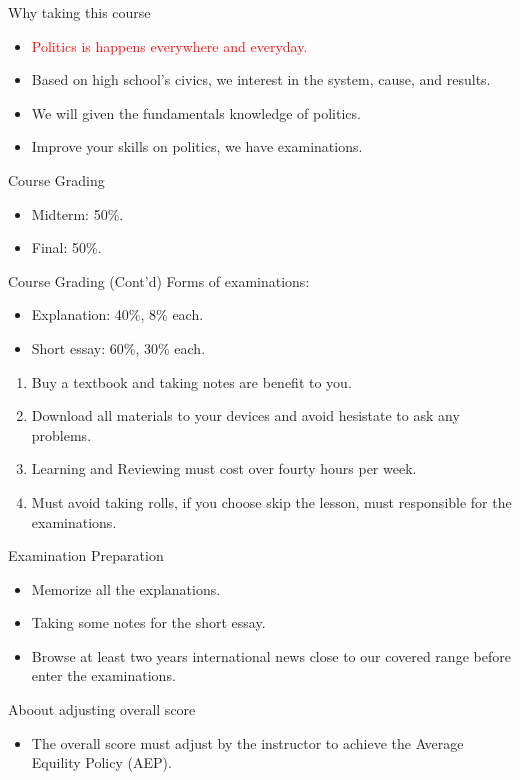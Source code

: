 \documentclass{beamer}
\begin{document}
\begin{frame}{Why taking this course}
\begin{itemize}
\pause
\item \textcolor{red}{Politics is happens everywhere and everyday.}
\pause
\item Based on high school's civics, we interest in the system, cause, and results.
\pause
\item We will given the fundamentals knowledge of politics.
\pause
\item Improve your skills on politics, we have examinations.
\end{itemize}
\end{frame}
\begin{frame}{Course Grading}
\begin{itemize}
\pause
\item Midterm: 50\%.
\pause
\item Final: 50\%.
\end{itemize}
\end{frame}
\begin{frame}{Course Grading (Cont'd)}
\pause
Forms of examinations:
\pause
\begin{itemize}
    \item Explanation: 40\%, 8\% each.
    \pause
    \item Short essay: 60\%, 30\% each.
\end{itemize}
\pause
\begin{enumerate}
\item Buy a textbook and taking notes are benefit to you.
\pause
\item Download all materials to your devices and avoid hesistate to ask any problems.
\pause
\item Learning and Reviewing must cost over fourty hours per week.
\pause
\item Must avoid taking rolls, if you choose skip the lesson, must responsible for the examinations.
\end{enumerate}
\end{frame}
\begin{frame}{Examination Preparation}
\begin{itemize}
\pause
\item Memorize all the explanations.
\pause
\item Taking some notes for the short essay.
\pause
\item Browse at least two years international news close to our covered range before enter the examinations.
\end{itemize}
\pause
{}
\begin{block}{Aboout adjusting overall score}
\pause
\begin{itemize}
\item The overall score must adjust by the instructor to achieve the Average Equility Policy (AEP).
\end{itemize}
\end{block}
\end{frame}
\end{document}
